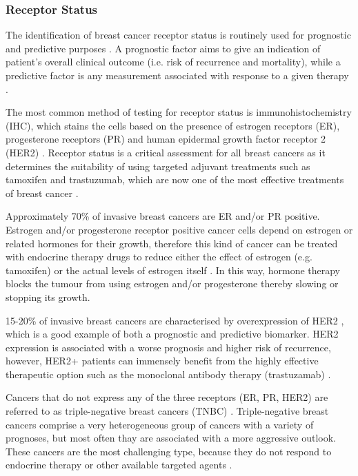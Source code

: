    
    \subsubsection{Receptor Status}
    
    The identification of breast cancer receptor status is routinely used for prognostic and predictive  purposes \cite{Zaha2014}. A prognostic factor aims to give an indication of patient's overall clinical outcome (i.e. risk of recurrence and mortality), while a predictive factor is any measurement associated with response to a given therapy \cite{cianfrocca2004prognostic}. 
    
    The most common method of testing for receptor status is immunohistochemistry (IHC), which stains the cells based on the presence of estrogen receptors (ER), progesterone receptors (PR) and  human epidermal growth factor receptor 2 (HER2) \cite{Zaha2014}. Receptor status is a critical assessment for all breast cancers as it determines the suitability of using targeted adjuvant treatments such as tamoxifen and trastuzumab, which are now one of the most effective treatments of breast cancer \cite{stickeler2011prognostic}. 

    Approximately 70\% of invasive breast cancers are ER and/or PR positive. Estrogen and/or progesterone receptor positive cancer cells depend on estrogen or related hormones for their growth, therefore this kind of cancer can be treated with endocrine therapy drugs to reduce either the effect of estrogen (e.g. tamoxifen) or the actual levels of estrogen itself \cite{early2005effects}. In this way, hormone therapy blocks the tumour from using estrogen and/or progesterone thereby slowing or stopping its growth. 

    15-20\% of invasive breast cancers are characterised by overexpression of HER2  \cite{stickeler2011prognostic}, which is a good example of both a prognostic and predictive biomarker. HER2 expression is associated with a worse prognosis and higher risk of recurrence, however, HER2+ patients can immensely benefit from the highly effective therapeutic option such as the monoclonal antibody therapy (trastuzamab) \cite{iqbal2014human}. 

    Cancers that do not express any of the three receptors (ER, PR, HER2) are referred to as triple-negative breast cancers (TNBC) \cite{foulkes2010triple}. Triple-negative breast cancers comprise a very heterogeneous group of cancers with a variety of prognoses, but most often thay are associated with a more aggressive outlook. These cancers are the most challenging type, because they do not respond to endocrine therapy or other available targeted agents \cite{hudis2011triple}. 

